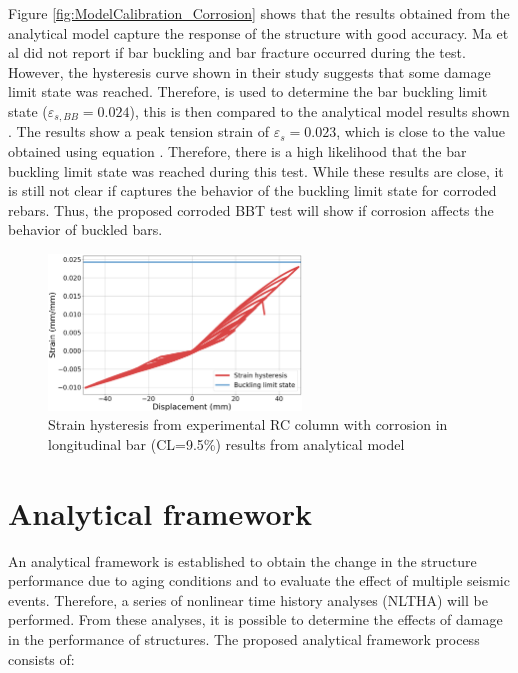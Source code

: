 Figure \ref{fig:ModelCalibration_Corrosion} shows that the results obtained from the analytical model capture the response of the structure with good accuracy. Ma et al \cite{Ma2012} did not report if bar buckling and bar fracture occurred during the test. However, the hysteresis curve shown in their study suggests that some damage limit state was reached. Therefore,  is used to determine the bar buckling limit state ($\varepsilon_{s,BB}=0.024$), this is then compared to the analytical model results shown . The results show a peak tension strain of $\varepsilon_{s}=0.023$, which is close to the value obtained using equation . Therefore, there is a high likelihood that the bar buckling limit state was reached during this test. While these results are close, it is still not clear if  captures the behavior of the buckling limit state for corroded rebars. Thus, the proposed corroded BBT test will show if corrosion affects the behavior of buckled bars.

\begin{figure}[htbp]
	\centering
	\includegraphics[width=0.6\textwidth]{Chapter-5/figs/MaEtAl_StrainHisteresis}
	\caption{Strain hysteresis from experimental RC column with corrosion in longitudinal bar (CL=9.5\%) results from analytical model}
	\label{fig:ModelCalibration_Corrosion_Hysteresis}
\end{figure}
\newpage
\section{Analytical framework}

An analytical framework is established to obtain the change in the structure performance due to aging conditions and to evaluate the effect of multiple seismic events. Therefore, a series of nonlinear time history analyses (NLTHA) will be performed. From these analyses, it is possible to determine the effects of damage in the performance of structures. The proposed analytical framework process consists of:

